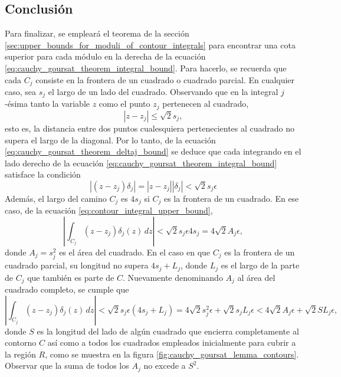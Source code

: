 \documentclass[a4paper]{report}
\begin{document}
\subsection*{Conclusión}

Para finalizar, se empleará el teorema de la sección \ref{sec:upper_bounds_for_moduli_of_contour_integrals} para encontrar una cota superior para cada módulo en la derecha de la ecuación \ref{eq:cauchy_goursat_theorem_integral_bound}. Para hacerlo, se recuerda que cada \(C_j\) consiste en la frontera de un cuadrado o cuadrado parcial. En cualquier caso, sea \(s_j\) el largo de un lado del cuadrado. Observando que en la integral \(j\)-ésima tanto la variable \(z\) como el punto \(z_j\) pertenecen al cuadrado,
\[
 |z-z_j|\leq\sqrt{2}s_j,
\]
esto es, la distancia entre dos puntos cualesquiera pertenecientes al cuadrado no supera el largo de la diagonal. Por lo tanto, de la ecuación \ref{eq:cauchy_goursat_theorem_deltaj_bound} se deduce que cada integrando en el lado derecho de la ecuación \ref{eq:cauchy_goursat_theorem_integral_bound} satisface la condición
\[
 |(z-z_j)\delta_j|=|z-z_j||\delta_j|<\sqrt{2}s_j\epsilon
\]
Además, el largo del camino \(C_j\) es \(4s_j\) si \(C_j\) es la frontera de un cuadrado. En ese caso, de la ecuación \ref{eq:contour_integral_upper_bound},
\begin{equation}\label{eq:cauchy_goursat_theorem_bound_complete}
 \left|\int_{C_j}(z-z_j)\delta_j(z)\,dz\right|<\sqrt{2}s_j\epsilon4s_j=4\sqrt{2}A_j\epsilon, 
\end{equation}
donde \(A_j=s^2_j\) es el área del cuadrado. En el caso en que \(C_j\) es la frontera de un cuadrado parcial, su longitud no supera \(4s_j+L_j\), donde \(L_j\) es el largo de la parte de \(C_j\) que también es parte de \(C\). Nuevamente denominando \(A_j\) al área del cuadrado completo, se cumple que 
\begin{equation}\label{eq:cauchy_goursat_theorem_bound_partial}
 \left|\int_{C_j}(z-z_j)\delta_j(z)\,dz\right|<\sqrt{2}s_j\epsilon(4s_j+L_j)=4\sqrt{2}s_j^2\epsilon+\sqrt{2}s_jL_j\epsilon<4\sqrt{2}A_j\epsilon+\sqrt{2}SL_j\epsilon, 
\end{equation}
donde \(S\) es la longitud del lado de algún cuadrado que encierra completamente al contorno \(C\) así como a todos los cuadrados empleados inicialmente para cubrir a la región \(R\), como se muestra en la figura \ref{fig:cauchy_goursat_lemma_contours}. Observar que la suma de todos los \(A_j\) no excede a \(S^2\).
\end{document}
